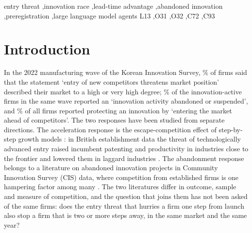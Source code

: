 \documentclass[preprint,12pt,authoryear]{elsarticle}
\begin{document}
\begin{frontmatter}
\begin{keyword}
entry threat \sep innovation race \sep lead-time advantage \sep abandoned innovation \sep preregistration \sep large language model agents
\JEL L13 \sep O31 \sep O32 \sep C72 \sep C93
\end{keyword}

\end{frontmatter}

\section{Introduction}

In the 2022 manufacturing wave of the Korean Innovation Survey, \ShareThreatHighTwoZeroTwoTwoMPct\% of firms said that the statement `entry of new competitors threatens market position' described their market to a high or very high degree; \QuitRateTwoZeroTwoTwoMPct\% of the innovation-active firms in the same wave reported an `innovation activity abandoned or suspended', and \PreemptRateTwoZeroTwoTwoMPct\% of all firms reported protecting an innovation by `entering the market ahead of competitors'. The two responses have been studied from separate directions. The acceleration response is the escape-competition effect of step-by-step growth models \citep{aghion2001competition,aghion2005competition}: in British establishment data the threat of technologically advanced entry raised incumbent patenting and productivity in industries close to the frontier and lowered them in laggard industries \citep{aghion2009entry}. The abandonment response belongs to a literature on abandoned innovation projects in Community Innovation Survey (CIS) data, where competition from established firms is one hampering factor among many \citep{garciavega2010determinants,lhuillery2009rd,leoncini2016learning,love2023dynamics}. The two literatures differ in outcome, sample and measure of competition, and the question that joins them has not been asked of the same firms: does the entry threat that hurries a firm one step from launch also stop a firm that is two or more steps away, in the same market and the same year?
\end{document}
